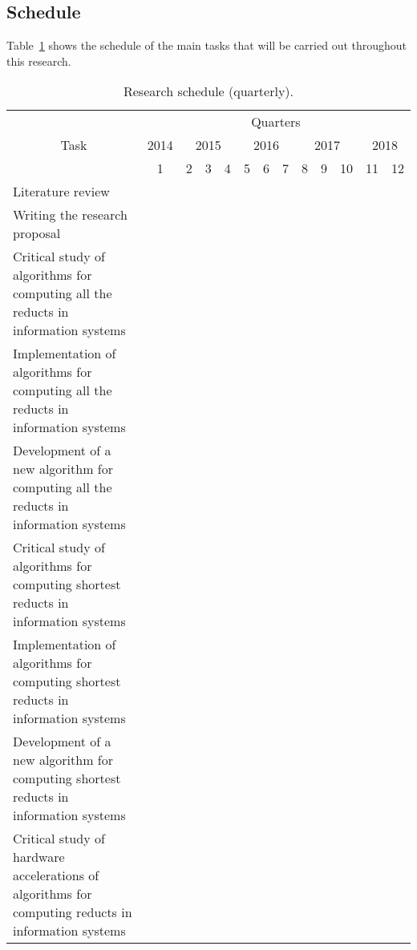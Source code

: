 \documentclass[authoryear,11pt]{elsarticle}
\begin{document}
\subsection{Schedule}
  Table~\ref{tab_Schedule} shows the schedule of the main tasks that will be carried out throughout this research.
 \begin{table}[h!]
		\caption{Research schedule (quarterly\protect\footnotemark).} \label{tab_Schedule}
		\centering
 	\begin{tabular}{|p{8cm}|c|c|c|c|c|c|c|c|c|c|c|c|}
 		\hline
		\multicolumn{1}{|c|}{\multirow{3}{*}{Task}} & \multicolumn{12}{c|}{Quarters}\\
 		\cline{2-13}
		 & 2014 & \multicolumn{3}{c|}{2015} & \multicolumn{3}{c|}{2016} & \multicolumn{3}{c|}{2017}
		 & \multicolumn{2}{c|}{2018} \\
 		\cline{2-13}
		 & 1 & 2 & 3 & 4 & 5 & 6 & 7 & 8 & 9 & 10 & 11 & 12 \\
		\hline
		Literature review &\cellcolor{blue}&\cellcolor{blue}&\cellcolor{blue}&
		\cellcolor[gray]{0.9}&\cellcolor[gray]{0.9}&\cellcolor[gray]{0.9}&\cellcolor[gray]{0.9}&
		\cellcolor[gray]{0.9}&\cellcolor[gray]{0.9}&\cellcolor[gray]{0.9}&\cellcolor[gray]{0.9}&
		\cellcolor[gray]{0.9}\\
		\hline
		Writing the research proposal &\cellcolor{blue}&\cellcolor{blue}&\cellcolor{blue}&&&&&&&&&\\
		\hline
		Critical study of algorithms for computing all the reducts in information systems
		&\cellcolor{blue}&\cellcolor{blue}&\cellcolor{blue}&&&&&&&&&\\
		\hline
		Implementation of algorithms for computing all the reducts in information systems
		&&\cellcolor{blue}&\cellcolor{blue}&&&&&&&&&\\
		\hline
		Development of a new algorithm for computing all the reducts in information systems
		&&&&\cellcolor[gray]{0.9}&&&&&&&&\\
		\hline
		Critical study of algorithms for computing shortest reducts in information systems
		&&&&\cellcolor[gray]{0.9}&\cellcolor[gray]{0.9}&\cellcolor[gray]{0.9}&&&&&&\\
		\hline
		Implementation of algorithms for computing shortest reducts in information systems
		&&&&&\cellcolor[gray]{0.9}&\cellcolor[gray]{0.9}&&&&&&\\
		\hline
		Development of a new algorithm for computing shortest reducts in information systems
		&&&&&&&\cellcolor[gray]{0.9}&&&&&\\
		\hline
		Critical study of hardware accelerations of algorithms for computing reducts in information systems

\end{tabular}
\end{table}
\end{document}
